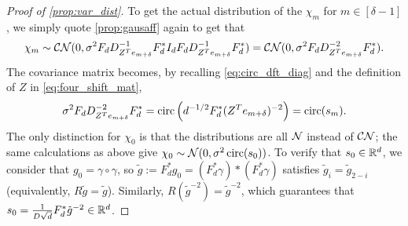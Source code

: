 \begin{proof}[Proof of \cref{prop:var_dist}]
  To get the actual distribution of the $\chi_m$ for $m \in [\delta - 1]$, we simply quote \cref{prop:gausaff} again to get that \[\chi_m \sim \mathcal{C N}(0, \sigma^2 F_d D^{-1}_{Z^T e_{m + \delta}} F_d^* I_d F_d D^{-1}_{Z^T e_{m + \delta}} F_d^*) = \mathcal{C N}(0, \sigma^2 F_d D^{-2}_{Z^T e_{m + \delta}} F_d^*).\] The covariance matrix becomes, by recalling \eqref{eq:circ_dft_diag} and the definition of $Z$ in \eqref{eq:four_shift_mat}, \[\sigma^2 F_d D^{-2}_{Z^T e_{m + \delta}} F_d^* = \operatorname{circ}\left(d^{-1/2} F_d^* (Z^T e_{m + \delta})^{-2}\right) = \operatorname{circ}(s_m).\]  The only distinction for $\chi_0$ is that the distributions are all $\mathcal{N}$ instead of $\mathcal{C N}$; the same calculations as above give $\chi_0 \sim \mathcal{N}(0, \sigma^2 \operatorname{circ}(s_0))$.  To verify that $s_0 \in \mathbb{R}^d$, we consider that $g_0 = \gamma \circ \gamma$, so $\tilde{g} := F_d^* g_0 = (F_d^* \gamma) * (F_d^* \gamma) $ satisfies $\tilde{g}_i = \tilde{g}_{2 - i}$ (equivalently, $R \tilde{g} = \tilde{g}$).  Similarly, $R(\tilde{g}^{-2}) = \tilde{g}^{-2}$, which guarantees that $s_0 = \frac{1}{D \sqrt{d}} F_d^* \tilde{g}^{-2} \in \mathbb{R}^d$.
\end{proof}
